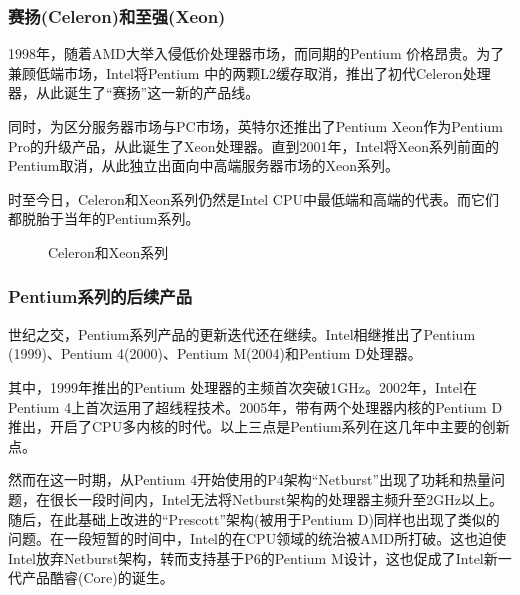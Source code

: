 \documentclass[UTF8]{ctexart}
\begin{document}
\subsubsection{赛扬(Celeron)和至强(Xeon)}
1998年，随着AMD大举入侵低价处理器市场，而同期的Pentium \uppercase\expandafter{}价格昂贵。为了兼顾低端市场，Intel将Pentium \uppercase\expandafter{}中的两颗L2缓存取消，推出了初代Celeron处理器，从此诞生了“赛扬”这一新的产品线。

同时，为区分服务器市场与PC市场，英特尔还推出了Pentium \uppercase\expandafter{} Xeon作为Pentium Pro的升级产品，从此诞生了Xeon处理器。直到2001年，Intel将Xeon系列前面的Pentium取消，从此独立出面向中高端服务器市场的Xeon系列。

时至今日，Celeron和Xeon系列仍然是Intel CPU中最低端和高端的代表。而它们都脱胎于当年的Pentium系列。
\begin{figure}[H]
    \centering
    \caption{Celeron和Xeon系列}
\end{figure}

\subsubsection{Pentium系列的后续产品}
世纪之交，Pentium系列产品的更新迭代还在继续。Intel相继推出了Pentium \uppercase\expandafter{}(1999)、Pentium 4(2000)、Pentium M(2004)和Pentium D处理器。

其中，1999年推出的Pentium \uppercase\expandafter{}处理器的主频首次突破1GHz。2002年，Intel在Pentium 4上首次运用了超线程技术。2005年，带有两个处理器内核的Pentium D推出，开启了CPU多内核的时代。以上三点是Pentium系列在这几年中主要的创新点。

然而在这一时期，从Pentium 4开始使用的P4架构“Netburst”出现了功耗和热量问题，在很长一段时间内，Intel无法将Netburst架构的处理器主频升至2GHz以上。随后，在此基础上改进的“Prescott”架构(被用于Pentium D)同样也出现了类似的问题。在一段短暂的时间中，Intel的在CPU领域的统治被AMD所打破。这也迫使Intel放弃Netburst架构，转而支持基于P6的Pentium M设计，这也促成了Intel新一代产品酷睿(Core)的诞生。
\end{document}
